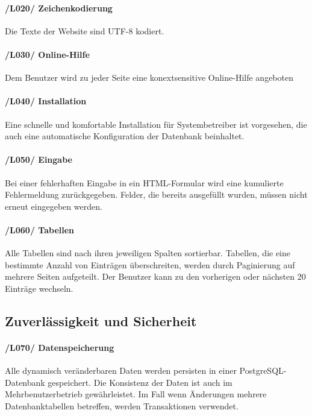 \documentclass{article}
\begin{document}
     \paragraph{/L020/ \label{L020} Zeichenkodierung} Die Texte  der Website sind UTF-8 kodiert.

      \paragraph{/L030/  \label{L030} Online-Hilfe} Dem Benutzer wird zu jeder Seite eine konextsensitive Online-Hilfe angeboten

      \paragraph{/L040/ \label{040} Installation}
      Eine schnelle und komfortable Installation für Systembetreiber ist vorgesehen, die auch eine automatische Konfiguration der Datenbank beinhaltet.

      \paragraph{/L050/ \label{L050} Eingabe}
      Bei einer fehlerhaften Eingabe in ein HTML-Formular wird eine kumulierte Fehlermeldung zurückgegeben. Felder, die bereits ausgefüllt wurden, müssen nicht erneut eingegeben werden.

      \paragraph{/L060/ \label{L060} Tabellen}

    Alle Tabellen sind nach ihren jeweiligen Spalten sortierbar. Tabellen,
    die eine bestimmte Anzahl von Einträgen überschreiten, werden durch Paginierung auf mehrere Seiten aufgeteilt. Der Benutzer kann zu den vorherigen oder nächsten 20 Einträge wechseln.


\subsection{Zuverlässigkeit und Sicherheit}
   \paragraph{/L070/ \label{070} Datenspeicherung}
   Alle dynamisch veränderbaren Daten werden persisten in einer PostgreSQL-Datenbank gespeichert. Die Konsistenz der Daten ist auch im Mehrbenutzerbetrieb gewährleistet. Im Fall wenn  Änderungen mehrere Datenbanktabellen betreffen, werden Transaktionen verwendet.
\end{document}
